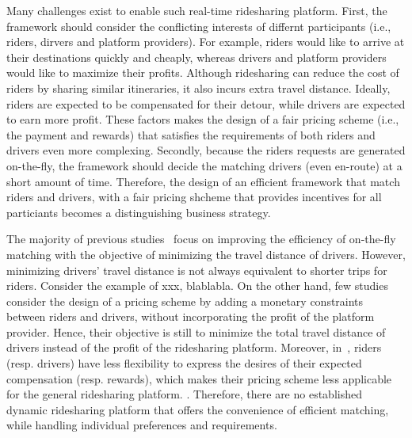 Many challenges exist to enable such real-time ridesharing platform. First, the framework should consider the conflicting interests of differnt participants (i.e., riders, dirvers and platform providers). For example, riders would like to arrive at their destinations quickly and cheaply, whereas drivers and platform providers would like to maximize their profits. Although ridesharing can reduce the cost of riders by sharing similar itineraries, it also incurs extra travel distance. Ideally, riders are expected to be compensated for their detour, while drivers are expected to earn more profit. These factors makes the design of a fair pricing scheme (i.e., the payment and rewards) that satisfies the requirements of both riders and drivers even more complexing. Secondly, because the riders requests are generated on-the-fly, the framework should decide the matching drivers (even en-route) at a short amount of time. Therefore, the design of an efficient framework that match riders and drivers, with a fair pricing shcheme that provides incentives for all particiants becomes a distinguishing business strategy. 

The majority of previous studies~\cite{} focus on improving the efficiency of on-the-fly matching with the objective of minimizing the travel distance of drivers. However, minimizing drivers' travel distance is not always equivalent to shorter trips for riders. Consider the example of xxx, blablabla. On the other hand, few studies~\cite{} consider the design of a pricing scheme by adding a monetary constraints between riders and drivers, without incorporating the profit of the platform provider. Hence, their objective is still to minimize the total travel distance of drivers instead of the profit of the ridesharing platform. Moreover, in~\cite{}, riders (resp. drivers) have less flexibility to express the desires of their expected compensation (resp. rewards), which makes their pricing scheme less applicable for the general ridesharing platform. . Therefore, there are no established dynamic ridesharing platform that offers the convenience of efficient matching, while handling individual preferences and requirements. 

